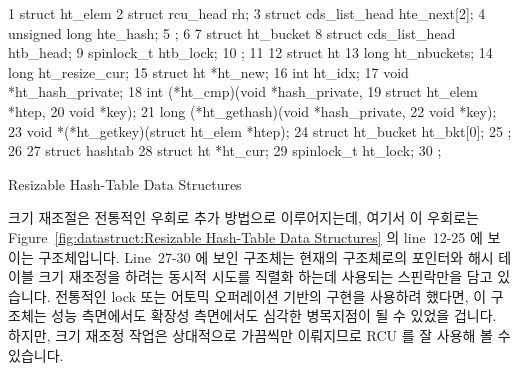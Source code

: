 \begin{listing}[tb]
{ \scriptsize
\begin{verbbox}
 1 struct ht_elem {
 2   struct rcu_head rh;
 3   struct cds_list_head hte_next[2];
 4   unsigned long hte_hash;
 5 };
 6 
 7 struct ht_bucket {
 8   struct cds_list_head htb_head;
 9   spinlock_t htb_lock;
10 };
11 
12 struct ht {
13   long ht_nbuckets;
14   long ht_resize_cur;
15   struct ht *ht_new;
16   int ht_idx;
17   void *ht_hash_private;
18   int (*ht_cmp)(void *hash_private,
19                 struct ht_elem *htep,
20                 void *key);
21   long (*ht_gethash)(void *hash_private,
22                      void *key);
23   void *(*ht_getkey)(struct ht_elem *htep);
24   struct ht_bucket ht_bkt[0];
25 };
26 
27 struct hashtab {
28   struct ht *ht_cur;
29   spinlock_t ht_lock;
30 };
\end{verbbox}
}
\centering
\theverbbox
\caption{Resizable Hash-Table Data Structures}
\label{lst:datastruct:Resizable Hash-Table Data Structures}
\end{listing}

크기 재조절은 전통적인 우회로 추가 방법으로 이루어지는데, 여기서 이 우회로는
Figure~\ref{fig:datastruct:Resizable Hash-Table Data Structures} 의 line~12-25
에 보이는  구조체입니다.
Line~27-30 에 보인  구조체는 현재의  구조체로의 포인터와
해시 테이블 크기 재조정을 하려는 동시적 시도를 직렬화 하는데 사용되는
스핀락만을 담고 있습니다.
전통적인 lock 또는 어토믹 오퍼레이션 기반의 구현을 사용하려 했다면, 이
 구조체는 성능 측면에서도 확장성 측면에서도 심각한 병목지점이 될 수
있었을 겁니다.
하지만, 크기 재조정 작업은 상대적으로 가끔씩만 이뤄지므로 RCU 를 잘 사용해 볼
수 있습니다.

